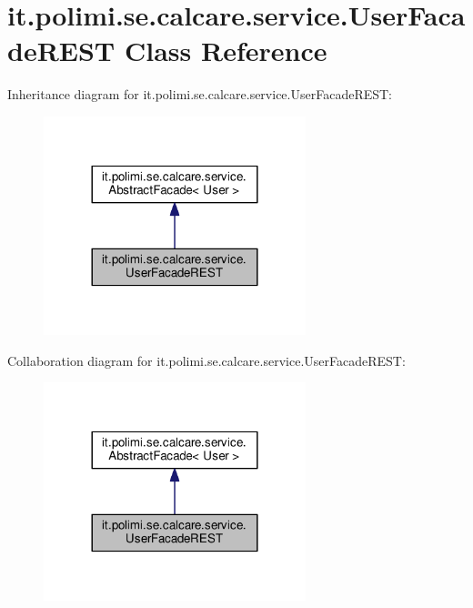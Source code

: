 \hypertarget{classit_1_1polimi_1_1se_1_1calcare_1_1service_1_1UserFacadeREST}{}\section{it.\+polimi.\+se.\+calcare.\+service.\+User\+Facade\+R\+E\+S\+T Class Reference}
\label{classit_1_1polimi_1_1se_1_1calcare_1_1service_1_1UserFacadeREST}


Inheritance diagram for it.\+polimi.\+se.\+calcare.\+service.\+User\+Facade\+R\+E\+S\+T\+:
\nopagebreak
\begin{figure}[H]
\begin{center}
\leavevmode
\includegraphics[width=216pt]{classit_1_1polimi_1_1se_1_1calcare_1_1service_1_1UserFacadeREST__inherit__graph}
\end{center}
\end{figure}


Collaboration diagram for it.\+polimi.\+se.\+calcare.\+service.\+User\+Facade\+R\+E\+S\+T\+:
\nopagebreak
\begin{figure}[H]
\begin{center}
\leavevmode
\includegraphics[width=216pt]{classit_1_1polimi_1_1se_1_1calcare_1_1service_1_1UserFacadeREST__coll__graph}
\end{center}
\end{figure}
